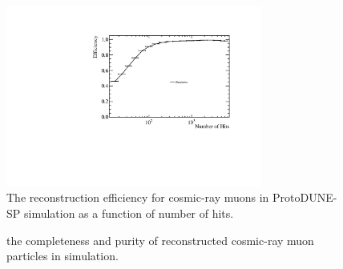 \begin{figure}
\centering
\includegraphics[width=0.75\textwidth]{Figures/Metrics/MC/Cosmics/CosmicRayEfficiencyVsNHits.pdf}
\caption{The reconstruction efficiency for cosmic-ray muons in ProtoDUNE-SP simulation as a function of number of hits.}
\label{fig:crrecoeff}
\end{figure}

\begin{figure}
\caption{\protect{} the completeness and \protect{} purity of reconstructed cosmic-ray muon particles in simulation.}
\label{fig:crrecopurcom}
\end{figure}

